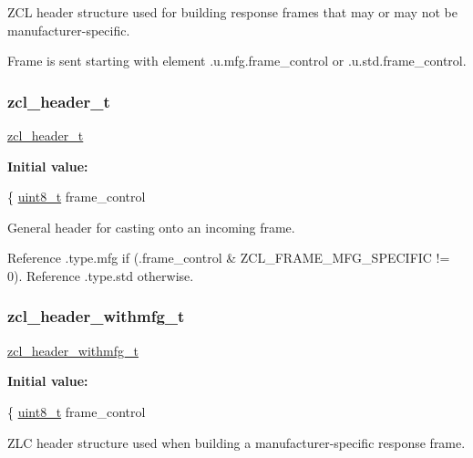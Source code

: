 Z\+CL header structure used for building response frames that may or may not be manufacturer-\/specific. 

Frame is sent starting with element .u.\+mfg.\+frame\+\_\+control or .u.\+std.\+frame\+\_\+control. \mbox{\label{group__zcl_gafc361d46dded7f1761048d78e3d4e18d}} 
\subsubsection{\texorpdfstring{zcl\+\_\+header\+\_\+t}{zcl\_header\_t}}
{\footnotesize\ttfamily \hyperlink{group__zcl_gafc361d46dded7f1761048d78e3d4e18d}{zcl\+\_\+header\+\_\+t}}

{\bfseries Initial value\+:}
\begin{DoxyCode}
\{
   \hyperlink{group__hal__dos_gae1affc9ca37cfb624959c866a73f83c2}{uint8\_t} frame\_control
\end{DoxyCode}


General header for casting onto an incoming frame. 

Reference .type.\+mfg if (.frame\+\_\+control \& Z\+C\+L\+\_\+\+F\+R\+A\+M\+E\+\_\+\+M\+F\+G\+\_\+\+S\+P\+E\+C\+I\+F\+IC != 0). Reference .type.\+std otherwise. \mbox{\label{group__zcl_gac376225f8ee77006b884a222a9ac25cc}} 
\subsubsection{\texorpdfstring{zcl\+\_\+header\+\_\+withmfg\+\_\+t}{zcl\_header\_withmfg\_t}}
{\footnotesize\ttfamily \hyperlink{group__zcl_gac376225f8ee77006b884a222a9ac25cc}{zcl\+\_\+header\+\_\+withmfg\+\_\+t}}

{\bfseries Initial value\+:}
\begin{DoxyCode}
\{
   \hyperlink{group__hal__dos_gae1affc9ca37cfb624959c866a73f83c2}{uint8\_t} frame\_control
\end{DoxyCode}


Z\+LC header structure used when building a manufacturer-\/specific response frame. 

